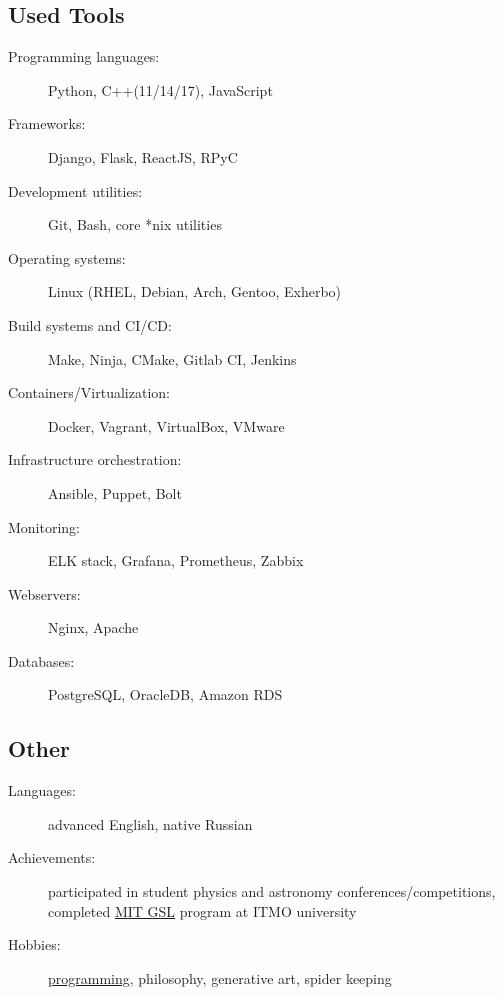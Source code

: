\documentclass[10pt]{report}
\begin{document}
\goodbreak

\subsection*{Used Tools}
\begin{description}
    \item[Programming languages:]
    Python, C++(11/14/17), JavaScript
    \item[Frameworks:]
    Django, Flask, ReactJS, RPyC
    \item[Development utilities:]
    Git, Bash, core *nix utilities
    \item[Operating systems:]
    Linux (RHEL, Debian, Arch, Gentoo, Exherbo)
    \item[Build systems and CI/CD:]
    Make, Ninja, CMake, Gitlab CI, Jenkins
    \item[Containers/Virtualization:]
    Docker, Vagrant, VirtualBox, VMware
    \item[Infrastructure orchestration:]
    Ansible, Puppet, Bolt
    \item[Monitoring:]
    ELK stack, Grafana, Prometheus, Zabbix
    \item[Webservers:]
    Nginx, Apache
    \item[Databases:]
    PostgreSQL, OracleDB, Amazon RDS
\end{description}

\subsection*{Other}
\begin{description}
    \item[Languages:]
    advanced English, native Russian
    \item[Achievements:]
    participated in student physics and astronomy conferences/competitions,
    completed \href{https://gsl.mit.edu/}{MIT GSL} program at ITMO university
    \item[Hobbies:]
    \href{https://github.com/unsip}{programming}, philosophy, generative art, spider keeping
\end{description}
\end{document}
